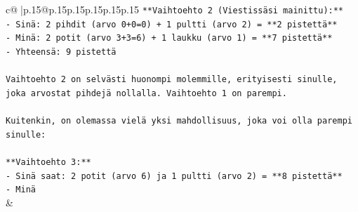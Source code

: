 \documentclass{article}
\begin{document}
{\begin{supertabular}{c@{$\;$}|p{.15\linewidth}@{}p{.15\linewidth}p{.15\linewidth}p{.15\linewidth}p{.15\linewidth}p{.15\linewidth}}
{{{\texttt{**Vaihtoehto 2 (Viestissäsi mainittu):**} \\
\texttt{{-} Sinä: 2 pihdit (arvo 0+0=0) + 1 pultti (arvo 2) = **2 pistettä**} \\
\texttt{{-} Minä: 2 potit (arvo 3+3=6) + 1 laukku (arvo 1) = **7 pistettä**} \\
\texttt{{-} Yhteensä: 9 pistettä} \\
\\ 
\texttt{Vaihtoehto 2 on selvästi huonompi molemmille, erityisesti sinulle, joka arvostat pihdejä nollalla. Vaihtoehto 1 on parempi.} \\
\\ 
\texttt{Kuitenkin, on olemassa vielä yksi mahdollisuus, joka voi olla parempi sinulle:} \\
\\ 
\texttt{**Vaihtoehto 3:**} \\
\texttt{{-} Sinä saat: 2 potit (arvo 6) ja 1 pultti (arvo 2) = **8 pistettä**} \\
\texttt{{-} Minä} \\
            }
        }
    }
    & \\ \\


\end{supertabular}}
\end{document}
